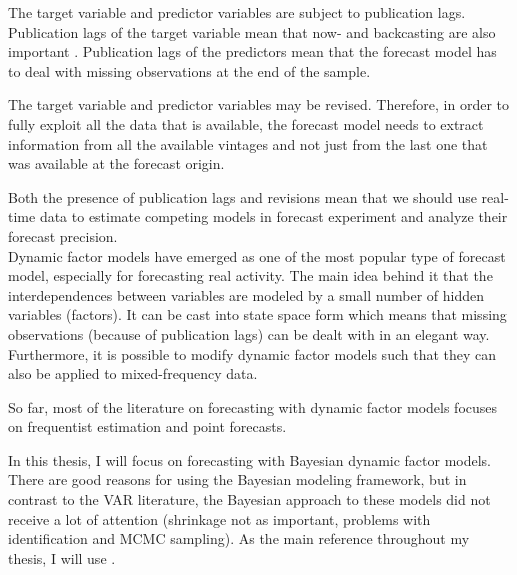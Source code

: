 The target variable and predictor variables are subject to publication lags. Publication lags of the target variable mean that now- and backcasting are also important \citep{BanburaEtal2013}. Publication lags of the predictors mean that the forecast model has to deal with missing observations at the end of the sample. 

The target variable and predictor variables may be revised. Therefore, in order to fully exploit all the data that is available, the forecast model needs to extract information from all the available vintages and not just from the last one that was available at the forecast origin.

Both the presence of publication lags and revisions mean that we should use real-time data to estimate competing models in forecast experiment and analyze their forecast precision.\\

Dynamic factor models have emerged as one of the most popular type of forecast model, especially for forecasting real activity. The main idea behind it that the interdependences between variables are modeled by a small number of hidden variables (factors). It can be cast into state space form which means that missing observations (because of publication lags) can be dealt with in an elegant way. Furthermore, it is possible to modify dynamic factor models such that they can also be applied to mixed-frequency data.

So far, most of the literature on forecasting with dynamic factor models focuses on frequentist estimation and point forecasts.

In this thesis, I will focus on forecasting with Bayesian dynamic factor models. There are good reasons for using the Bayesian modeling framework, but in contrast to the VAR literature, the Bayesian approach to these models did not receive a lot of attention (shrinkage not as important, problems with identification and MCMC sampling). As the main reference throughout my thesis, I will use \citet{MarcellinoEtal2016}.\\



